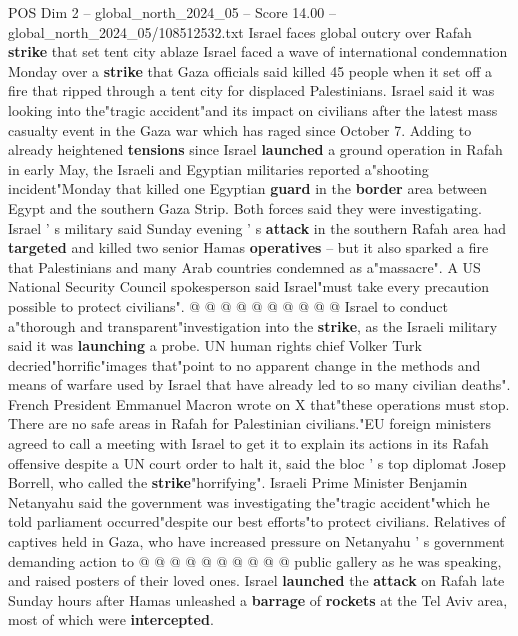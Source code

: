 \begin{textsample}{POS Dim 2 – global\_north\_2024\_05 – Score 14.00 – global\_north\_2024\_05/108512532.txt}  \label{ex:f2_pos_390}
Israel faces global outcry over Rafah \textbf{strike} that set tent city ablaze Israel faced a wave of international condemnation Monday over a \textbf{strike} that Gaza officials said killed 45 people when it set off a fire that ripped through a tent city for displaced Palestinians.
Israel said it was looking into the"tragic accident"and its impact on civilians after the latest mass casualty event in the Gaza war which has raged since October 7.
Adding to already heightened \textbf{tensions} since Israel \textbf{launched} a ground operation in Rafah in early May, the Israeli and Egyptian militaries reported a"shooting incident"Monday that killed one Egyptian \textbf{guard} in the \textbf{border} area between Egypt and the southern Gaza Strip.
Both forces said they were investigating.
Israel ' s military said Sunday evening ' s \textbf{attack} in the southern Rafah area had \textbf{targeted} and killed two senior Hamas \textbf{operatives} -- but it also sparked a fire that Palestinians and many Arab countries condemned as a"massacre".
A US National Security Council spokesperson said Israel"must take every precaution possible to protect civilians". @ @ @ @ @ @ @ @ @ @ Israel to conduct a"thorough and transparent"investigation into the \textbf{strike}, as the Israeli military said it was \textbf{launching} a probe.
UN human rights chief Volker Turk decried"horrific"images that"point to no apparent change in the methods and means of warfare used by Israel that have already led to so many civilian deaths".
French President Emmanuel Macron wrote on X that"these operations must stop.
There are no safe areas in Rafah for Palestinian civilians."EU foreign ministers agreed to call a meeting with Israel to get it to explain its actions in its Rafah offensive despite a UN court order to halt it, said the bloc ' s top diplomat Josep Borrell, who called the \textbf{strike}"horrifying".
Israeli Prime Minister Benjamin Netanyahu said the government was investigating the"tragic accident"which he told parliament occurred"despite our best efforts"to protect civilians.
Relatives of captives held in Gaza, who have increased pressure on Netanyahu ' s government demanding action to @ @ @ @ @ @ @ @ @ @ public gallery as he was speaking, and raised posters of their loved ones.
Israel \textbf{launched} the \textbf{attack} on Rafah late Sunday hours after Hamas unleashed a \textbf{barrage} of \textbf{rockets} at the Tel Aviv area, most of which were \textbf{intercepted}.

\end{textsample}
